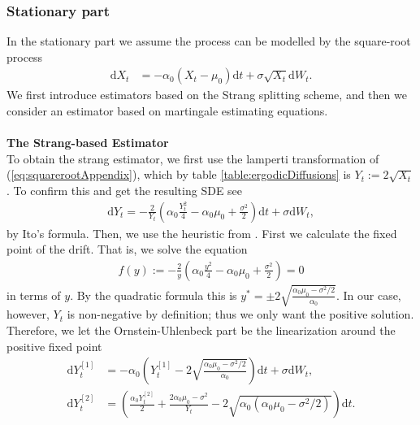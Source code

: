 \subsubsection{Stationary part}\label{subsubsec:squarerootStationary}
In the stationary part we assume the process can be modelled by the square-root process
\begin{align}
    \mathrm{d}X_t &= -\alpha_0\left(X_t - \mu_0\right)\mathrm{d}t + \sigma \sqrt{X_t} \mathrm{d}W_t. \label{eq:squarerootAppendix}
\end{align}
We first introduce estimators based on the Strang splitting scheme, and then we consider an estimator based on martingale estimating equations.\\\\
\noindent \textbf{The Strang-based Estimator}\\
To obtain the strang estimator, we first use the lamperti transformation of (\ref{eq:squarerootAppendix}), which by table \ref{table:ergodicDiffusions} is $Y_t := 2\sqrt{X_t}$. To confirm this and get the resulting SDE see
\begin{align}
    \mathrm{d}Y_t = - \frac{2}{Y_t}\left(\alpha_0 \frac{Y_t^2}{4} - \alpha_0 \mu_0 + \frac{\sigma^2}{2}\right)\mathrm{d}t + \sigma \mathrm{d}W_t, \label{eq:lampertiSquarerootAppendix}
\end{align}
by Ito's formula. Then, we use the heuristic from \cite[section 2.3 and 2.5]{SplittingSchemes}. First we calculate the fixed point of the drift. That is, we solve the equation
\begin{align}
    f(y) := - \frac{2}{y}\left(\alpha_0 \frac{y^2}{4} - \alpha_0 \mu_0 + \frac{\sigma^2}{2}\right) = 0
\end{align}
in terms of $y$. By the quadratic formula this is $y^* = \pm 2\sqrt{\frac{\alpha_0\mu_0 - \sigma^2 / 2}{\alpha_0}}$. In our case, however, $Y_t$ is non-negative by definition; thus we only want the positive solution. Therefore, we let the Ornstein-Uhlenbeck part be the linearization around the positive fixed point
\begin{align}
    \mathrm{d}Y_t^{[1]} &= -\alpha_0 \left(Y_t^{[1]} - 2\sqrt{\frac{\alpha_0\mu_0 - \sigma^2 / 2}{\alpha_0}}\right)\mathrm{d}t + \sigma \mathrm{d}W_t , \label{eq:squarerootStationarySplit1} \\
    \mathrm{d}Y_t^{[2]} &= \left(\frac{\alpha_0 Y_t^{[2]}}{2} + \frac{2\alpha_0 \mu_0 - \sigma^2}{Y_t} - 2\sqrt{\alpha_0\left(\alpha_0\mu_0 - \sigma^2 / 2\right)}\right)\mathrm{d}t. \label{eq:squarerootStationarySplit2}
\end{align}
